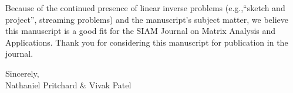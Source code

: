 \documentclass[11pt]{article}
\begin{document}
Because of the continued presence of linear inverse problems (e.g.,``sketch and project'', streaming problems) and the manuscript’s subject matter, we believe this manuscript is a good fit for the SIAM Journal on  Matrix Analysis and Applications. Thank you for considering this manuscript for publication in the journal.
\medskip

\noindent Sincerely, \\
Nathaniel Pritchard \& Vivak Patel

\end{document}

